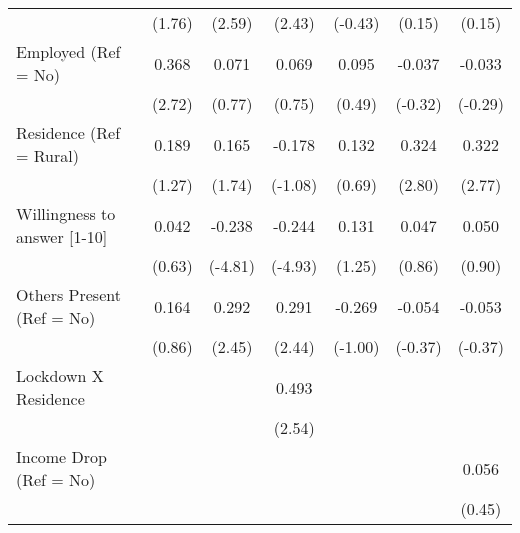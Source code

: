 \begin{table*}[!ht]
\begin{adjustwidth}{-1.25in}{0in}
\begin{tabular}{l*{6}{c}}
                    &      (1.76)         &      (2.59)         &      (2.43)         &     (-0.43)         &      (0.15)         &      (0.15)         \\
[1em]
Employed (Ref = No)            &       0.368\sym{**} &      0.071         &      0.069         &      0.095         &     -0.037         &     -0.033        \\
                    &      (2.72)         &      (0.77)         &      (0.75)         &      (0.49)         &     (-0.32)         &     (-0.29)         \\
[1em]
Residence (Ref = Rural)    &       0.189         &       0.165         &      -0.178         &       0.132         &       0.324\sym{**} &       0.322\sym{**} \\
                    &      (1.27)         &      (1.74)         &     (-1.08)         &      (0.69)         &      (2.80)         &      (2.77)         \\
[1em]
Willingness to answer [1-10]&      0.042         &      -0.238\sym{***}&      -0.244\sym{***}&       0.131         &      0.047         &      0.050         \\
                    &      (0.63)         &     (-4.81)         &     (-4.93)         &      (1.25)         &      (0.86)         &      (0.90)         \\
[1em]
Others Present  (Ref = No)    &       0.164         &       0.292\sym{*}  &       0.291\sym{*}  &      -0.269         &     -0.054         &     -0.053         \\
                    &      (0.86)         &      (2.45)         &      (2.44)         &     (-1.00)         &     (-0.37)         &     (-0.37)         \\
[1em]
Lockdown X Residence&                     &                     &       0.493\sym{*}  &                     &                     &                     \\
                    &                     &                     &      (2.54)         &                     &                     &                     \\
[1em]
Income Drop (Ref = No)    &                     &                     &                     &                     &                     &      0.056         \\
                    &                     &                     &                     &                     &                     &      (0.45)         \\

\end{tabular}
\end{adjustwidth}
\end{table*}
